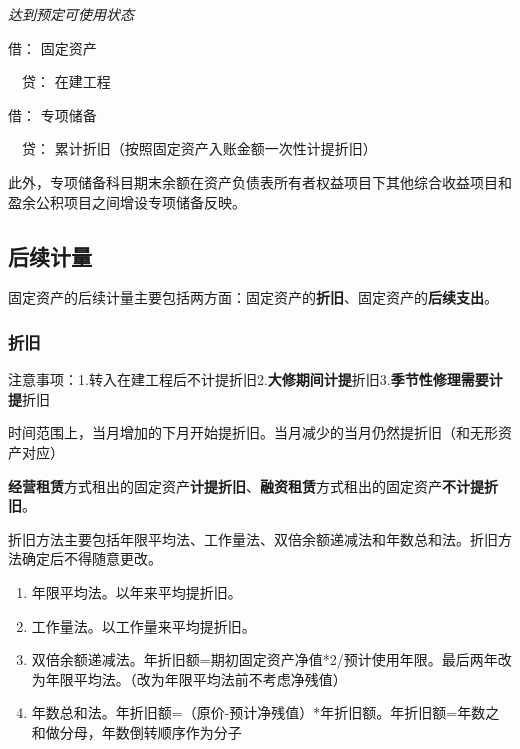 \documentclass[UTF8,12pt]{ctexart}
\newenvironment{Dr}{\noindent 借：}{\par}
\newenvironment{Cr}{\noindent \ \ 贷：}{\par}
\numberwithin{equation}{section} %
\numberwithin{figure}{section}
\numberwithin{table}{section}
\begin{document}
	\textit{达到预定可使用状态}
	
	\begin{Dr}
		固定资产
	\end{Dr}
	\begin{Cr}
		在建工程
	\end{Cr}
	
	\begin{Dr}
		专项储备
	\end{Dr}
	\begin{Cr}
		累计折旧（按照固定资产入账金额一次性计提折旧）
	\end{Cr}
	
	此外，专项储备科目期末余额在资产负债表所有者权益项目下其他综合收益项目和盈余公积项目之间增设专项储备反映。
	
	
	
	\subsection{后续计量}
	固定资产的后续计量主要包括两方面：固定资产的\textbf{折旧}、固定资产的\textbf{后续支出}。
	
	\subsubsection{折旧}
	注意事项：1.转入在建工程后不计提折旧2.\textbf{大修期间计提}折旧3.\textbf{季节性修理需要计提}折旧
	
	时间范围上，当月增加的下月开始提折旧。当月减少的当月仍然提折旧（和无形资产对应）
	
	\textbf{经营租赁}方式租出的固定资产\textbf{计提折旧}、\textbf{融资租赁}方式租出的固定资产\textbf{不计提折旧}。
	
	折旧方法主要包括年限平均法、工作量法、双倍余额递减法和年数总和法。折旧方法确定后不得随意更改。
	
	\begin{enumerate}
		\item 年限平均法。以年来平均提折旧。
		
		\item 工作量法。以工作量来平均提折旧。
		
		\item 双倍余额递减法。年折旧额=期初固定资产净值*2/预计使用年限。最后两年改为年限平均法。（改为年限平均法前不考虑净残值）
		
		\item 年数总和法。年折旧额=（原价-预计净残值）*年折旧额。年折旧额=年数之和做分母，年数倒转顺序作为分子
	\end{enumerate}
	
\end{document}
